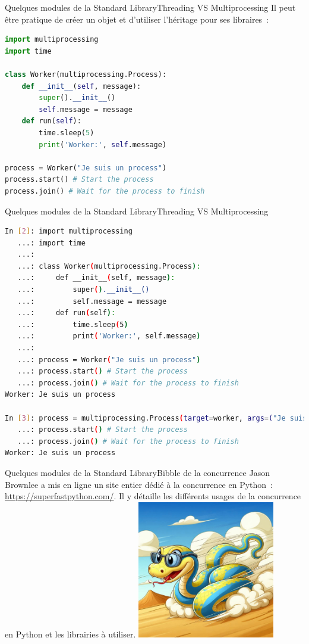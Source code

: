 \documentclass{beamer}
\begin{document}
    \begin{frame}[fragile]{Quelques modules de la Standard Library}{Threading VS Multiprocessing}
        Il peut être pratique de créer un objet et d'utiliser l'héritage pour ses libraires~:
        \begin{lstlisting}[language=Python]
import multiprocessing
import time

class Worker(multiprocessing.Process):
    def __init__(self, message):
        super().__init__()
        self.message = message
    def run(self):
        time.sleep(5)
        print('Worker:', self.message)

process = Worker("Je suis un process")
process.start() # Start the process
process.join() # Wait for the process to finish
        \end{lstlisting}
    \end{frame}

    \begin{frame}[fragile]{Quelques modules de la Standard Library}{Threading VS Multiprocessing}
        \begin{lstlisting}[language=Bash]
In [2]: import multiprocessing
   ...: import time
   ...:
   ...: class Worker(multiprocessing.Process):
   ...:     def __init__(self, message):
   ...:         super().__init__()
   ...:         self.message = message
   ...:     def run(self):
   ...:         time.sleep(5)
   ...:         print('Worker:', self.message)
   ...:
   ...: process = Worker("Je suis un process")
   ...: process.start() # Start the process
   ...: process.join() # Wait for the process to finish
Worker: Je suis un process

In [3]: process = multiprocessing.Process(target=worker, args=("Je suis un process",))
   ...: process.start() # Start the process
   ...: process.join() # Wait for the process to finish
Worker: Je suis un process
        \end{lstlisting}
    \end{frame}

    \begin{frame}{Quelques modules de la Standard Library}{Bibble de la concurrence}
        Jason Brownlee a mis en ligne un site entier dédié à la concurrence en Python~: \url{https://superfastpython.com/}.
        \bigbreak
        Il y détaille les différents usages de la concurrence en Python et les librairies à utiliser.
        \bigbreak
        \centering
        \includegraphics[width=6cm]{image/super-fast-python}
    \end{frame}
\end{document}
